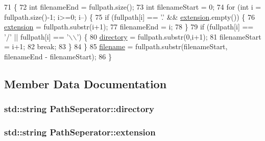\begin{DoxyCode}
71 \{
72     \textcolor{keywordtype}{int} filenameEnd = fullpath.size();
73     \textcolor{keywordtype}{int} filenameStart = 0;
74     \textcolor{keywordflow}{for} (\textcolor{keywordtype}{int} i = fullpath.size()-1; i>=0; i--) \{
75         \textcolor{keywordflow}{if} (fullpath[i] == \textcolor{charliteral}{'.'} && \hyperlink{struct_path_seperator_a986f1ce49f0ad6233a525562fbbc25a6}{extension}.empty()) \{
76             \hyperlink{struct_path_seperator_a986f1ce49f0ad6233a525562fbbc25a6}{extension} = fullpath.substr(i+1);
77             filenameEnd = i;
78         \}
79         \textcolor{keywordflow}{if} (fullpath[i] == \textcolor{charliteral}{'/'} || fullpath[i] == \textcolor{charliteral}{'\(\backslash\)\(\backslash\)'})  \{
80             \hyperlink{struct_path_seperator_a91bdacb37b263197f8a8f05e73481fc4}{directory} = fullpath.substr(0,i+1);
81             filenameStart = i+1;
82             \textcolor{keywordflow}{break};
83         \}
84     \}
85     \hyperlink{struct_path_seperator_a969fd95b83c553bf3e355c657ed742af}{filename} = fullpath.substr(filenameStart, filenameEnd - filenameStart);
86 \}
\end{DoxyCode}


\subsection{Member Data Documentation}
\subsubsection[{\texorpdfstring{directory}{directory}}]{\setlength{\rightskip}{0pt plus 5cm}std\+::string Path\+Seperator\+::directory}\hypertarget{struct_path_seperator_a91bdacb37b263197f8a8f05e73481fc4}{}\label{struct_path_seperator_a91bdacb37b263197f8a8f05e73481fc4}
\subsubsection[{\texorpdfstring{extension}{extension}}]{\setlength{\rightskip}{0pt plus 5cm}std\+::string Path\+Seperator\+::extension}\hypertarget{struct_path_seperator_a986f1ce49f0ad6233a525562fbbc25a6}{}\label{struct_path_seperator_a986f1ce49f0ad6233a525562fbbc25a6}
